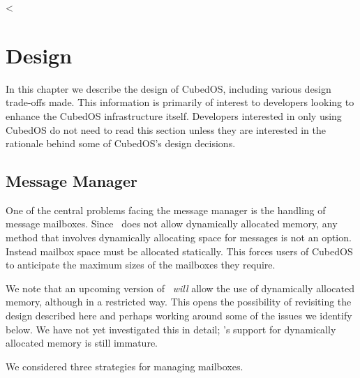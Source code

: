 <
\chapter{Design}
\label{chapt:design}

In this chapter we describe the design of CubedOS, including various design trade-offs made.
This information is primarily of interest to developers looking to enhance the CubedOS
infrastructure itself. Developers interested in only using CubedOS do not need to read this
section unless they are interested in the rationale behind some of CubedOS's design decisions.

\section{Message Manager}
\label{sec:design-message-manager}

One of the central problems facing the message manager is the handling of message mailboxes.
Since \SPARK\ does not allow dynamically allocated memory, any method that involves dynamically
allocating space for messages is not an option. Instead mailbox space must be allocated
statically. This forces users of CubedOS to anticipate the maximum sizes of the mailboxes they
require.

We note that an upcoming version of \SPARK\ \emph{will} allow the use of dynamically allocated
memory, although in a restricted way. This opens the possibility of revisiting the design
described here and perhaps working around some of the issues we identify below. We have not yet
investigated this in detail; \SPARK's support for dynamically allocated memory is still
immature.

We considered three strategies for managing mailboxes.

